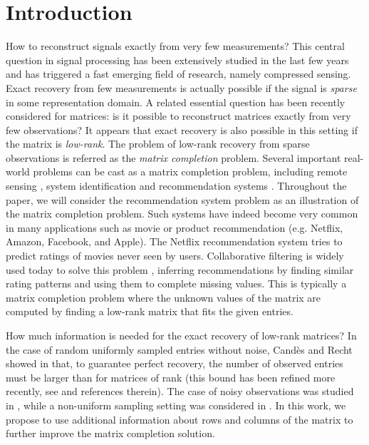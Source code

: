 \documentclass{article}
\begin{document}
\section{Introduction}
\vspace{-0.2cm}
How to reconstruct signals exactly from very few measurements? This central question in signal processing has been extensively studied in the last few years and has triggered a fast emerging field of research, namely compressed sensing. Exact recovery from few measurements is actually possible if the signal is {\it sparse} in some representation domain. A related essential question has been recently considered for matrices: is it possible to reconstruct matrices exactly from very few observations? It appears that exact recovery is also possible in this setting if the matrix is {\it low-rank}. The problem of low-rank recovery from sparse observations is referred as the {\it matrix completion} problem. Several important real-world problems can be cast as a matrix completion problem, including remote sensing \cite{art:Schmidt86RemoteSensing}, system identification \cite{art:LiuVandenberghe09SysIden} and recommendation systems \cite{srebro2004maximum}. Throughout the paper, we will consider the recommendation system problem as an illustration of the matrix completion problem.
Such systems have indeed become very common in many applications such as movie or product recommendation (e.g. Netflix, Amazon, Facebook, and Apple). 
The Netflix recommendation system tries to predict ratings of movies never seen by users. Collaborative filtering is widely used today to solve this problem \cite{breese1998empirical}, inferring recommendations by finding similar rating patterns and using them to complete missing values. This is typically a matrix completion problem where the unknown values of the matrix are computed by finding a low-rank matrix that fits the given entries.

How much information is needed for the exact recovery of low-rank matrices? 
In the case of random uniformly sampled entries without noise, Cand{\`e}s and Recht showed in \cite{candes2009exact} that, to guarantee perfect recovery, the number of observed entries must be larger than  for  matrices of rank  (this bound has been refined more recently, see \cite{recht2011simpler} and references therein). 
The case of noisy observations was studied in \cite{candes2010matrix,negahban2012restricted}, while a non-uniform sampling setting was considered in \cite{salakhutdinov2010collaborative}. 
In this work, we propose to use additional information about rows and columns of the matrix to further improve the matrix completion solution.
\end{document}
